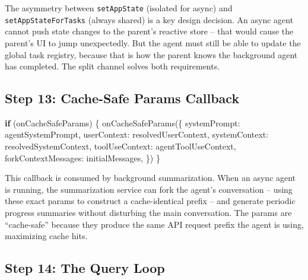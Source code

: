 \documentclass[
  english,
  11pt,
  letterpaper,
]{book}
\newenvironment{Shaded}{\begin{snugshade}}{\end{snugshade}}
\newcommand{\ControlFlowTok}[1]{\textcolor[rgb]{0.00,0.23,0.31}{\textbf{#1}}}
\newcommand{\FunctionTok}[1]{\textcolor[rgb]{0.28,0.35,0.67}{#1}}
\newcommand{\NormalTok}[1]{\textcolor[rgb]{0.00,0.23,0.31}{#1}}
\newcommand{\OperatorTok}[1]{\textcolor[rgb]{0.37,0.37,0.37}{#1}}
\begin{document}
The asymmetry between \texttt{setAppState} (isolated for async) and
\texttt{setAppStateForTasks} (always shared) is a key design decision.
An async agent cannot push state changes to the parent's reactive store
-- that would cause the parent's UI to jump unexpectedly. But the agent
must still be able to update the global task registry, because that is
how the parent knows the background agent has completed. The split
channel solves both requirements.

\subsection{Step 13: Cache-Safe Params
Callback}\label{step-13-cache-safe-params-callback}

\begin{Shaded}
\begin{Highlighting}[]
\ControlFlowTok{if}\NormalTok{ (onCacheSafeParams) \{}
  \FunctionTok{onCacheSafeParams}\NormalTok{(\{}
\NormalTok{    systemPrompt}\OperatorTok{:}\NormalTok{ agentSystemPrompt}\OperatorTok{,}
\NormalTok{    userContext}\OperatorTok{:}\NormalTok{ resolvedUserContext}\OperatorTok{,}
\NormalTok{    systemContext}\OperatorTok{:}\NormalTok{ resolvedSystemContext}\OperatorTok{,}
\NormalTok{    toolUseContext}\OperatorTok{:}\NormalTok{ agentToolUseContext}\OperatorTok{,}
\NormalTok{    forkContextMessages}\OperatorTok{:}\NormalTok{ initialMessages}\OperatorTok{,}
\NormalTok{  \})}
\NormalTok{\}}
\end{Highlighting}
\end{Shaded}

This callback is consumed by background summarization. When an async
agent is running, the summarization service can fork the agent's
conversation -- using these exact params to construct a cache-identical
prefix -- and generate periodic progress summaries without disturbing
the main conversation. The params are ``cache-safe'' because they
produce the same API request prefix the agent is using, maximizing cache
hits.

\subsection{Step 14: The Query Loop}\label{step-14-the-query-loop}
\end{document}
